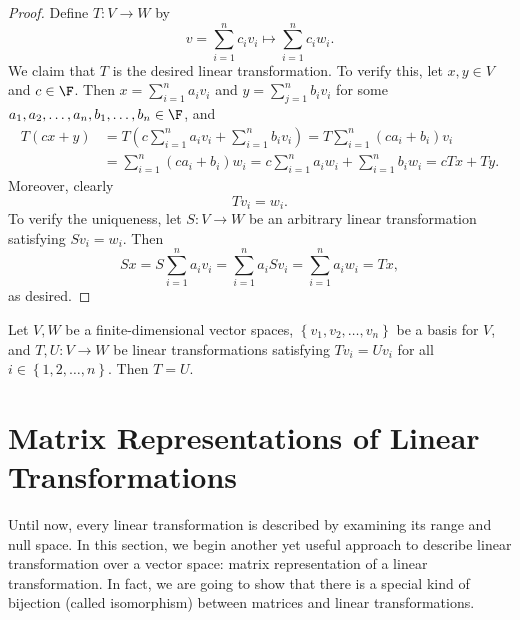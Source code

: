 \documentclass[linearalgebra]{subfiles}
\begin{document}
    \begin{proof}
        Define $T:V\to W$ by
        \begin{equation*}
            v=\sum^{n}_{i=1} c_iv_i\mapsto \sum^{n}_{i=1} c_iw_i.
        \end{equation*}
        We claim that $T$ is the desired linear transformation. To verify this, let $x, y\in V$ and $c\in \F$. Then $x=\sum^{n}_{i=1} a_iv_i$ and $y=\sum^{n}_{j=1} b_iv_i$ for some $a_1,a_2,\ldots,a_n, b_1,\ldots,b_n\in\F$, and 
        \begin{align*}
            T(cx+y) & = T \left( c\sum^n_{i=1} a_iv_i + \sum^n_{i=1} b_iv_i \right) = T \sum^n_{i=1} (ca_i+b_i)v_i \\
                    & = \sum^n_{i=1} (ca_i+b_i)w_i = c\sum^n_{i=1} a_iw_i + \sum^n_{i=1} b_iw_i = cTx+Ty.
        \end{align*}
        Moreover, clearly
        \begin{equation*}
            Tv_i = w_i.
        \end{equation*}
        To verify the uniqueness, let $S: V\to W$ be an arbitrary linear transformation satisfying $Sv_i = w_i$. Then
        \begin{equation*}
            Sx = S \sum^n_{i=1} a_iv_i = \sum^n_{i=1} a_i Sv_i = \sum^n_{i=1} a_iw_i = Tx,
        \end{equation*}
        as desired.
    \end{proof}

    \begin{cor}{}
        Let $V, W$ be a finite-dimensional vector spaces, $\left\lbrace v_1, v_2, \ldots, v_n \right\rbrace$ be a basis for $V$, and $T,U: V\to W$ be linear transformations satisfying $Tv_i = Uv_i$ for all $i\in \left\lbrace 1, 2, \ldots, n \right\rbrace$. Then $T = U$.
    \end{cor}	

    \section{Matrix Representations of Linear Transformations}

    \begin{remark}
        Until now, every linear transformation is described by examining its range and null space. In this section, we begin another yet useful approach to describe linear transformation over a vector space: matrix representation of a linear transformation. In fact, we are going to show that there is a special kind of bijection (called isomorphism) between matrices and linear transformations.
    \end{remark}
\end{document}

